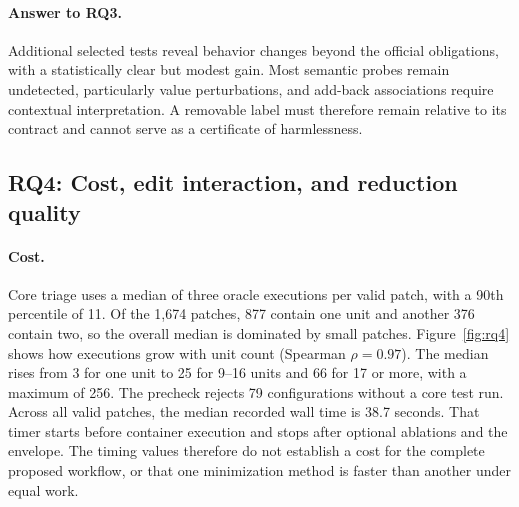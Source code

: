 \documentclass[a4paper,fleqn]{cas-sc}
\begin{document}
\paragraph{Answer to RQ3.}
Additional selected tests reveal behavior changes beyond the official obligations, with a statistically clear but modest gain. Most semantic probes remain undetected, particularly value perturbations, and add-back associations require contextual interpretation. A removable label must therefore remain relative to its contract and cannot serve as a certificate of harmlessness.

\subsection{RQ4: Cost, edit interaction, and reduction quality}\label{sec:rq4}

\paragraph{Cost.}
Core triage uses a median of three oracle executions per valid patch, with a 90th percentile of 11. Of the 1,674 patches, 877 contain one unit and another 376 contain two, so the overall median is dominated by small patches. Figure~\ref{fig:rq4} shows how executions grow with unit count (Spearman $\rho=0.97$). The median rises from 3 for one unit to 25 for 9--16 units and 66 for 17 or more, with a maximum of 256. The precheck rejects 79 configurations without a core test run. Across all valid patches, the median recorded wall time is 38.7 seconds. That timer starts before container execution and stops after optional ablations and the envelope. The timing values therefore do not establish a cost for the complete proposed workflow, or that one minimization method is faster than another under equal work.
\end{document}
